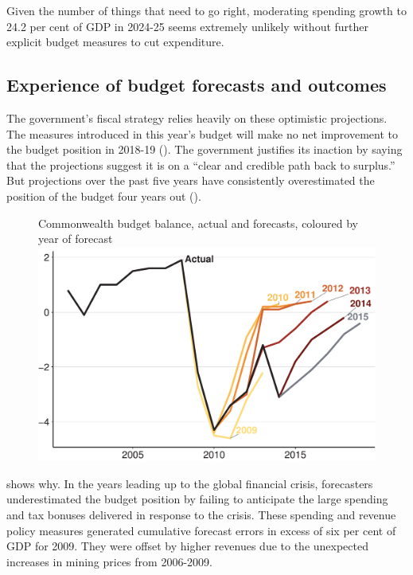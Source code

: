 Given the number of things that need to go right, moderating spending growth to 24.2 per cent of GDP in 2024-25 seems extremely unlikely without further explicit budget measures to cut expenditure.

\subsection{Experience of budget forecasts and outcomes}\label{subsubsec:3-3-3}
The government’s fiscal strategy relies heavily on these optimistic projections. The measures introduced in this year’s budget will make no net improvement to the budget position in 2018-19 (). The government justifies its inaction by saying that the projections suggest it is on a “clear and credible path back to surplus.”  But projections over the past five years have consistently overestimated the position of the budget four years out (). 
\begin{figure}
%
{Commonwealth budget balance, actual and forecasts, coloured by year of forecast}
\includegraphics[width=\columnwidth]{Fiscal-challenges/figure/Figure9a-1.pdf}
\end{figure}

 shows why. In the years leading up to the global financial crisis, forecasters underestimated the budget position by failing to anticipate the large spending and tax bonuses delivered in response to the crisis. These spending and revenue policy measures generated cumulative forecast errors in excess of six per cent of GDP for 2009.  They were offset by higher revenues due to the unexpected increases in mining prices from 2006-2009.

